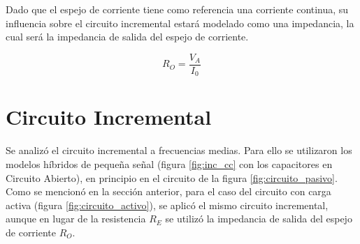 



Dado que el espejo de corriente tiene como referencia una corriente continua, su influencia sobre el circuito incremental estará modelado como una impedancia, la cual será la impedancia de salida del espejo de corriente.

\begin{equation}
    R_O = \frac{V_A}{I_0} 
    \label{eq:imp salida fte corriente}
\end{equation}

\newpage
\section{Circuito Incremental}

Se analizó el circuito incremental a frecuencias medias. Para ello se utilizaron los modelos híbridos de pequeña señal (figura \ref{fig:inc_cc} con los capacitores en Circuito Abierto), en principio en el circuito de la figura \ref{fig:circuito_pasivo}. Como se mencionó en la sección anterior, para el caso del circuito con carga activa (figura \ref{fig:circuito_activo}), se aplicó el mismo circuito incremental, aunque en lugar de la resistencia $R_E$ se utilizó la impedancia de salida del espejo de corriente $R_O$.

